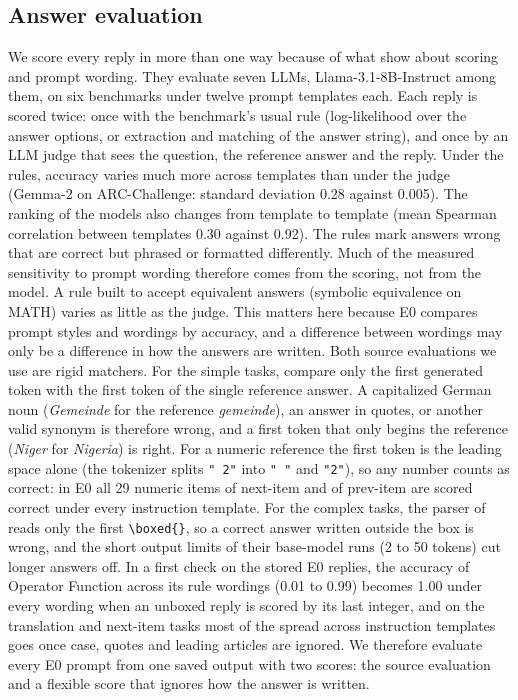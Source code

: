 \documentclass[11pt,a4paper]{article}
\begin{document}
\subsection{Answer evaluation}\label{sec:evaluation}
We score every reply in more than one way because of what \citet{hua2025flaw} show about scoring and prompt wording. They evaluate seven LLMs, Llama-3.1-8B-Instruct among them, on six benchmarks under twelve prompt templates each. Each reply is scored twice: once with the benchmark's usual rule (log-likelihood over the answer options, or extraction and matching of the answer string), and once by an LLM judge that sees the question, the reference answer and the reply. Under the rules, accuracy varies much more across templates than under the judge (Gemma-2 on ARC-Challenge: standard deviation 0.28 against 0.005). The ranking of the models also changes from template to template (mean Spearman correlation between templates 0.30 against 0.92). The rules mark answers wrong that are correct but phrased or formatted differently. Much of the measured sensitivity to prompt wording therefore comes from the scoring, not from the model. A rule built to accept equivalent answers (symbolic equivalence on MATH) varies as little as the judge. This matters here because E0 compares prompt styles and wordings by accuracy, and a difference between wordings may only be a difference in how the answers are written. Both source evaluations we use are rigid matchers. For the simple tasks, \citet{yang2026shared} compare only the first generated token with the first token of the single reference answer. A capitalized German noun (\emph{Gemeinde} for the reference \emph{gemeinde}), an answer in quotes, or another valid synonym is therefore wrong, and a first token that only begins the reference (\emph{Niger} for \emph{Nigeria}) is right. For a numeric reference the first token is the leading space alone (the tokenizer splits \texttt{" 2"} into \texttt{" "} and \texttt{"2"}), so any number counts as correct: in E0 all 29 numeric items of next-item and of prev-item are scored correct under every instruction template. For the complex tasks, the parser of \citet{fu2026rules} reads only the first \texttt{\textbackslash boxed\{\}}, so a correct answer written outside the box is wrong, and the short output limits of their base-model runs (2 to 50 tokens) cut longer answers off. In a first check on the stored E0 replies, the accuracy of Operator Function across its rule wordings (0.01 to 0.99) becomes 1.00 under every wording when an unboxed reply is scored by its last integer, and on the translation and next-item tasks most of the spread across instruction templates goes once case, quotes and leading articles are ignored. We therefore evaluate every E0 prompt from one saved output with two scores: the source evaluation and a flexible score that ignores how the answer is written.
\end{document}
